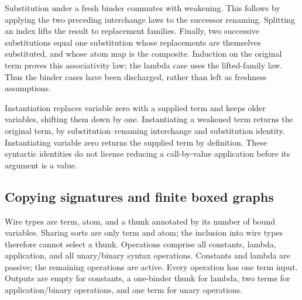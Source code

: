 Substitution under a fresh binder commutes with weakening. This follows by
applying the two preceding interchange laws to the successor renaming. Splitting
an index lifts the result to replacement families. Finally, two successive
substitutions equal one substitution whose replacements are themselves
substituted, and whose atom map is the composite. Induction on the original
term proves this associativity law; the lambda case uses the lifted-family law.
Thus the binder cases have been discharged, rather than left as freshness
assumptions.




Instantiation replaces variable zero with a supplied term and keeps older
variables, shifting them down by one. Instantiating a weakened term returns
the original term, by substitution--renaming interchange and substitution
identity. Instantiating variable zero returns the supplied term by definition.
These syntactic identities do not license reducing a call-by-value application
before its argument is a value.




\subsection{Copying signatures and finite boxed graphs}

Wire types are term, atom, and a thunk annotated by its number of bound
variables. Sharing sorts are only term and atom; the inclusion into wire types
therefore cannot select a thunk. Operations comprise all constants, lambda,
application, and all unary/binary syntax operations. Constants and lambda are
passive; the remaining operations are active. Every operation has one term
input. Outputs are empty for constants, a one-binder thunk for lambda, two
terms for application/binary operations, and one term for unary operations.


